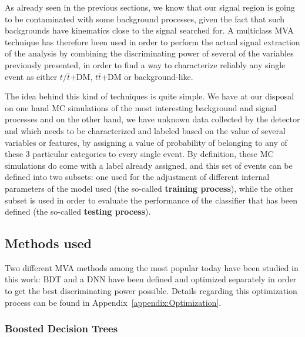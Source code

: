 \documentclass[a4paper, 10pt, openright]{report}
\begin{document}
As already seen in the previous sections, we know that our signal region is going to be contaminated with some background processes, given the fact that such backgrounds have kinematics close to the signal searched for. A multiclass \acf{MVA} technique has therefore been used in order to perform the actual signal extraction of the analysis by combining the discriminating power of several of the variables previously presented, in order to find a way to characterize reliably any single event as either $t/\bar t$+DM, $t \bar t$+DM or background-like.

The idea behind this kind of techniques is quite simple. We have at our disposal on one hand \ac{MC} simulations of the most interesting background and signal processes and on the other hand, we have unknown data collected by the detector and which needs to be characterized and labeled based on the value of several variables or features, by assigning a value of probability of belonging to any of these 3 particular categories to every single event. By definition, these \ac{MC} simulations do come with a label already assigned, and this set of events can be defined into two subsets: one used for the adjustment of different internal parameters of the model used (the so-called \textbf{training process}), while the other subset is used in order to evaluate the performance of the classifier that has been defined (the so-called \textbf{testing process}).

\subsection{Methods used}

Two different \ac{MVA} methods among the most popular today have been studied in this work: \acf{BDT} and a \acf{DNN} have been defined and optimized separately in order to get the best discriminating power possible. Details regarding this optimization process can be found in Appendix~\ref{appendix:Optimization}.

\subsubsection{Boosted Decision Trees}\label{section:BDT}
\end{document}
